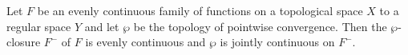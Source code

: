 Let $F$ be an evenly continuous family of functions on a topological space $X$ to a regular space $Y$ and let $\wp$ be the topology of pointwise convergence. Then the $\wp$-closure $F^{-}$ of $F$ is evenly continuous and $\wp$ is jointly continuous on $F^{-}$.
